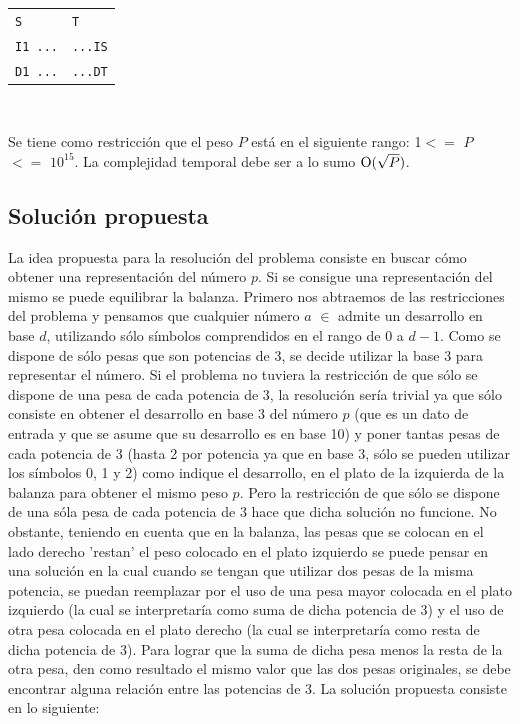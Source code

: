 	\begin{tabular}{ll}
		\texttt{S} & \texttt{T} \\
		\texttt{I1 ...} & \texttt{...IS} \\
		\texttt{D1 ...} & \texttt{...DT} \\
	\end{tabular}

	~

	Se tiene como restricción que el peso $P$ está en el siguiente rango: 1$<=$ $P$ $<=$ $10^{15}$. La complejidad temporal debe ser a lo sumo $\operatorname{O}(\sqrt{P})$. 

    \subsection{Solución propuesta}

	La idea propuesta para la resolución del problema consiste en buscar cómo obtener una representación del número $p$. Si se consigue una representación del mismo se puede equilibrar la balanza. Primero nos abtraemos de las restricciones del problema y pensamos que cualquier número $a$ $\in$  admite un desarrollo en base $d$, utilizando sólo símbolos comprendidos en el rango de 0 a $d-1$. Como se dispone de sólo pesas que son potencias de 3, se decide utilizar la base 3 para representar el número. Si el problema no tuviera la restricción de que sólo se dispone de una pesa de cada potencia de 3, la resolución sería trivial ya que sólo consiste en obtener el desarrollo en base 3 del número $p$ (que es un dato de entrada y que se asume que su desarrollo es en base 10) y poner tantas pesas de cada potencia de 3 (hasta 2 por potencia ya que en base 3, sólo se pueden utilizar los símbolos 0, 1 y 2) como indique el desarrollo, en el plato de la izquierda de la balanza para obtener el mismo peso $p$. Pero la restricción de que sólo se dispone de una sóla pesa de cada potencia de 3 hace que dicha solución no funcione. No obstante, teniendo en cuenta que en la balanza, las pesas que se colocan en el lado derecho 'restan' el peso colocado en el plato izquierdo se puede pensar en una solución en la cual cuando se tengan que utilizar dos pesas de la misma potencia, se puedan reemplazar por el uso de una pesa mayor colocada en el plato izquierdo (la cual se interpretaría como suma de dicha potencia de 3) y el uso de otra pesa colocada en el plato derecho (la cual se interpretaría como resta de dicha potencia de 3). Para lograr que la suma de dicha pesa menos la resta de la otra pesa, den como resultado el mismo valor que las dos pesas originales, se debe encontrar alguna relación entre las potencias de 3. La solución propuesta consiste en lo siguiente: 


